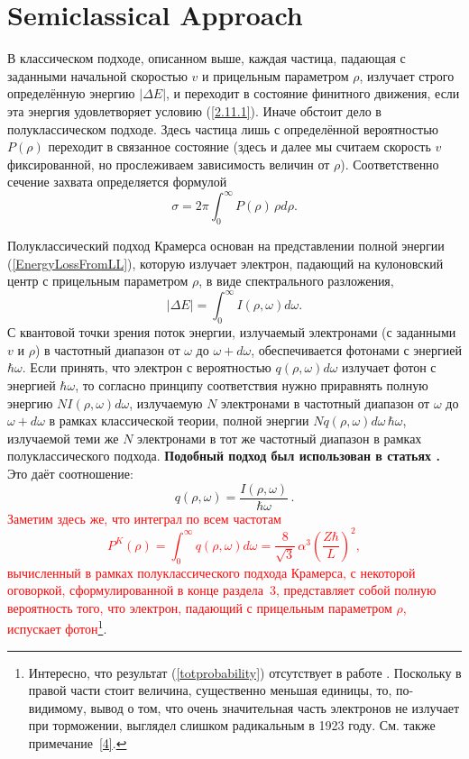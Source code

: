 \documentclass{SovJurn/JETPL}
\begin{document}
\section{Semiclassical Approach}

В классическом подходе, описанном выше, каждая частица, падающая с заданными начальной скоростью $v$ и прицельным параметром $\rho$, излучает строго определённую энергию $|\Delta E|$, и переходит в состояние финитного движения, если эта энергия удовлетворяет условию (\ref{2.11.1}). Иначе обстоит дело в полуклассическом подходе. Здесь частица лишь с определённой вероятностью $P(\rho)$ переходит в связанное состояние (здесь и далее мы считаем скорость $v$ фиксированной, но прослеживаем зависимость величин от $\rho$). Соответственно сечение захвата определяется формулой
\begin{equation}
\label{crosssection}
\sigma=2\pi\int_0^{\infty}P(\rho)\,\rho d\rho.
\end{equation}

Полуклассический подход Крамерса основан на представлении полной энергии (\ref{EnergyLossFromLL}), которую излучает электрон, падающий на кулоновский центр с прицельным параметром $\rho$, в виде спектрального разложения,
\begin{equation}
\label{spectrum}
|\Delta E|=\int_0^{\infty}I(\rho,\omega)d\omega.
\end{equation}
С квантовой точки зрения поток энергии, излучаемый электронами (с заданными $v$ и $\rho$) в частотный диапазон от $\omega$ до $\omega+d\omega$, обеспечивается фотонами с энергией $\hbar\omega$. Если принять, что электрон с вероятностью $q(\rho,\omega)d\omega$ излучает фотон с энергией $\hbar\omega$, то согласно принципу соответствия нужно приравнять полную энергию $NI(\rho,\omega)d\omega$, излучаемую $N$ электронами в частотный диапазон от $\omega$ до $\omega+d\omega$ в рамках классической теории, полной энергии $Nq(\rho,\omega) d\omega\, \hbar\omega$, излучаемой теми же $N$ электронами в тот же частотный диапазон в рамках полуклассического подхода. \textbf{Подобный подход был использован в статьях \cite{kogan_eldin}.} Это даёт соотношение:
\begin{equation}
\label{difprobability}
q(\rho,\omega)=\frac{I(\rho,\omega)}{\hbar\omega}\,.
\end{equation}
\textcolor{Red}{Заметим здесь же, что интеграл по всем частотам
\begin{equation}
\label{totprobability}
P^K(\rho)=\int_0^{\infty}q(\rho,\omega)d\omega=
\frac{8}{\sqrt{3}}\,\alpha^3\left(\frac{Z\hbar}{L}\right)^2,
\end{equation}
вычисленный в рамках полуклассического подхода Крамерса, с некоторой оговоркой, сформулированной в конце раздела~3, представляет собой полную вероятность того, что электрон, падающий с прицельным параметром $\rho$, испускает фотон}\footnote{Интересно, что результат (\ref{totprobability}) отсутствует в работе \cite{kramers1923xciii}. Поскольку в правой части стоит величина, существенно меньшая единицы, то, по-видимому, вывод о том, что очень значительная часть электронов не излучает при торможении, выглядел слишком радикальным в 1923 году. См. также примечание~\ref{4}.}.
\end{document}
